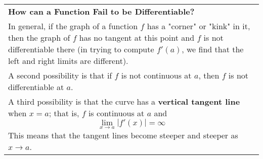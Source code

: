 \documentclass[fleqn]{article}
\begin{document}
\begin{center}
\def\arraystretch{1.3}
{\setlength{\tabcolsep}{16pt}
\begin{tabularx}{.9\textwidth}{|X|}
\hline
	\vspace{1pt}
	\textbf{How can a Function Fail to be Differentiable?} \\
	In general, if the graph of a function $f$ has a "corner" or "kink" in it, then the graph of $f$ has no tangent at this point and $f$ is not differentiable there (in trying to compute $f'(a)$, we find that the left and right limits are different). \\[3pt]
	A second possibility is that if $f$ is not continuous at $a$, then $f$ is not differentiable at $a$. \\[3pt]
	A third possibility is that the curve has a \textbf{vertical tangent line} when $x = a$; that is, $f$ is continuous at $a$ and 
	$$\underset{x \to a}{\lim} |f'(x)| = \infty$$
	This means that the tangent lines become steeper and steeper as $x \to a$.
	\\[16pt]
	\hline
\end{tabularx}}
\vspace{12pt}


\end{center}
\end{document}
